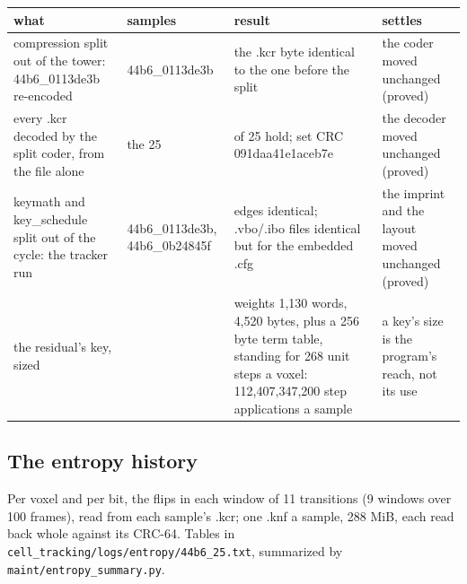 {\footnotesize
\setlength{\tabcolsep}{6pt}
\begin{longtable}{>{\RaggedRight\arraybackslash}p{}>{\RaggedRight\arraybackslash}p{}>{\RaggedRight\arraybackslash}p{}>{\RaggedRight\arraybackslash}p{}}
\toprule
what & samples & result & settles \\
\midrule
\endhead
compression split out of the tower: 44b6\_\allowbreak{}0113de3b re-encoded & 44b6\_\allowbreak{}0113de3b & the .kcr byte identical to the one before the split & the coder moved unchanged (proved) \\
every .kcr decoded by the split coder, from the file alone & the 25 & 25 of 25 hold; set CRC 091daa41e1aceb7e & the decoder moved unchanged (proved) \\
keymath and key\_\allowbreak{}schedule split out of the cycle: the tracker run & 44b6\_\allowbreak{}0113de3b, 44b6\_\allowbreak{}0b24845f & edges identical; .vbo/.ibo files identical but for the embedded .cfg & the imprint and the layout moved unchanged (proved) \\
the residual's key, sized &  & weights 1,130 words, 4,520 bytes, plus a 256 byte term table, standing for 268 unit steps a voxel: 112,407,347,200 step applications a sample & a key's size is the program's reach, not its use \\
\bottomrule
\end{longtable}
}

\subsection{\texorpdfstring{The entropy history}{The entropy history}}

Per voxel and per bit, the flips in each window of 11 transitions (9 windows over 100 frames), read from each sample's .kcr; one .knf a sample, 288 MiB, each read back whole against its CRC-64. Tables in \texttt{cell\_\allowbreak{}tracking/\allowbreak{}logs/\allowbreak{}entropy/\allowbreak{}44b6\_\allowbreak{}25.\allowbreak{}txt}, summarized by \texttt{maint/\allowbreak{}entropy\_\allowbreak{}summary.\allowbreak{}py}.

